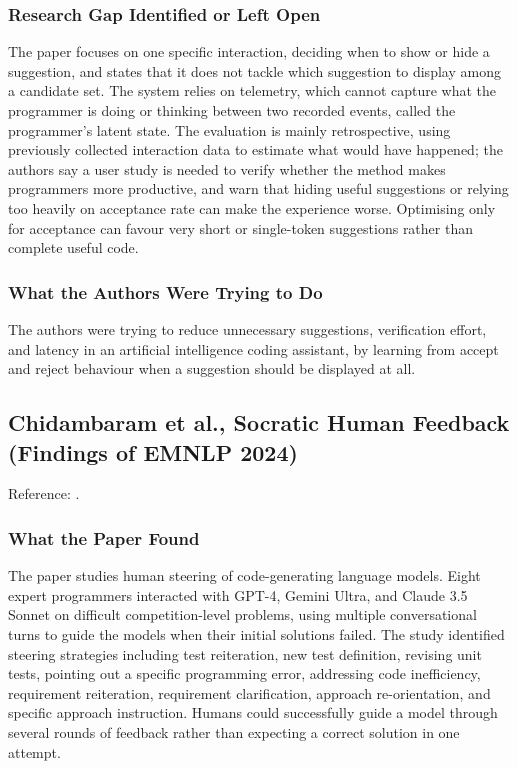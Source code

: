 \documentclass[11pt,a4paper]{report}
\begin{document}
\subsubsection{Research Gap Identified or Left Open}

The paper focuses on one specific interaction, deciding when to show or
hide a suggestion, and states that it does not tackle which suggestion
to display among a candidate set. The system relies on telemetry, which
cannot capture what the programmer is doing or thinking between two
recorded events, called the programmer's latent state. The evaluation
is mainly retrospective, using previously collected interaction data to
estimate what would have happened; the authors say a user study is
needed to verify whether the method makes programmers more productive,
and warn that hiding useful suggestions or relying too heavily on
acceptance rate can make the experience worse. Optimising only for
acceptance can favour very short or single-token suggestions rather
than complete useful code.

\subsubsection{What the Authors Were Trying to Do}

The authors were trying to reduce unnecessary suggestions, verification
effort, and latency in an artificial intelligence coding assistant, by
learning from accept and reject behaviour when a suggestion should be
displayed at all.

\subsection{Chidambaram et al., Socratic Human Feedback (Findings of
EMNLP 2024)}

\noindent Reference: \autocite{chidambaram2024sohf}.

\subsubsection{What the Paper Found}

The paper studies human steering of code-generating language models.
Eight expert programmers interacted with GPT-4, Gemini Ultra, and
Claude 3.5 Sonnet on difficult competition-level problems, using
multiple conversational turns to guide the models when their initial
solutions failed. The study identified steering strategies including
test reiteration, new test definition, revising unit tests, pointing
out a specific programming error, addressing code inefficiency,
requirement reiteration, requirement clarification, approach
re-orientation, and specific approach instruction. Humans could
successfully guide a model through several rounds of feedback rather
than expecting a correct solution in one attempt.
\end{document}

